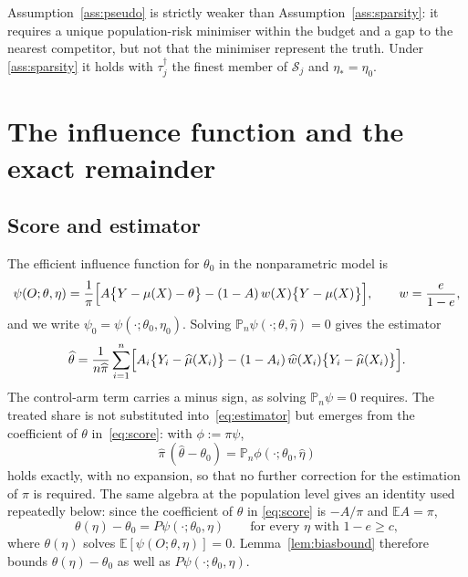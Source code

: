 \documentclass[11pt]{article}
\theoremstyle{plain}
\theoremstyle{definition}
\theoremstyle{remark}
\newcommand{\E}{\mathbb{E}}
\newcommand{\Pn}{\mathbb{P}_n}
\newcommand{\cS}{\mathcal{S}}
\newcommand{\mhat}{\widehat{\mu}}
\newcommand{\what}{\widehat{w}}
\newcommand{\thetahat}{\widehat{\theta}}
\newcommand{\pihat}{\widehat{\pi}}
\begin{document}
\noindent Assumption~\ref{ass:pseudo} is strictly weaker than
Assumption~\ref{ass:sparsity}: it requires a unique population-risk minimiser
within the budget and a gap to the nearest competitor, but not that the
minimiser represent the truth. Under \ref{ass:sparsity} it holds with
$\tau^\dagger_j$ the finest member of $\cS_j$ and $\eta_*=\eta_0$.

\section{The influence function and the exact remainder}\label{sec:eif}

\subsection{Score and estimator}

The efficient influence function for $\theta_0$ in the nonparametric model is
\citep{hahn1998}
\begin{equation}\label{eq:score}
  \psi(O;\theta,\eta)
  =\frac1\pi\Bigl[A\bigl\{Y-\mu(X)-\theta\bigr\}
   -(1-A)\,w(X)\bigl\{Y-\mu(X)\bigr\}\Bigr],
  \qquad w=\frac e{1-e},
\end{equation}
and we write $\psi_0=\psi(\cdot;\theta_0,\eta_0)$. Solving
$\Pn\psi(\cdot;\theta,\widehat\eta)=0$ gives the estimator
\begin{equation}\label{eq:estimator}
  \thetahat=\frac1{n\pihat}\sum_{i=1}^n
  \Bigl[A_i\bigl\{Y_i-\mhat(X_i)\bigr\}
   -(1-A_i)\,\what(X_i)\bigl\{Y_i-\mhat(X_i)\bigr\}\Bigr].
\end{equation}
The control-arm term carries a minus sign, as solving $\Pn\psi=0$ requires. The
treated share is not substituted into~\eqref{eq:estimator} but emerges from the
coefficient of $\theta$ in~\eqref{eq:score}: with $\phi:=\pi\psi$,
\begin{equation}\label{eq:exact-pi}
  \pihat\,(\thetahat-\theta_0)
  =\Pn\phi(\cdot;\theta_0,\widehat\eta)
\end{equation}
holds exactly, with no expansion, so that no further correction for the
estimation of $\pi$ is required. The same algebra at the population level gives an
identity used repeatedly below: since the coefficient of $\theta$ in
\eqref{eq:score} is $-A/\pi$ and $\E A=\pi$,
\begin{equation}\label{eq:pop-identity}
  \theta(\eta)-\theta_0=P\psi(\cdot;\theta_0,\eta)
  \qquad\text{for every }\eta\text{ with }1-e\ge c,
\end{equation}
where $\theta(\eta)$ solves $\E[\psi(O;\theta,\eta)]=0$. Lemma~\ref{lem:biasbound}
therefore bounds $\theta(\eta)-\theta_0$ as well as $P\psi(\cdot;\theta_0,\eta)$.
\end{document}
